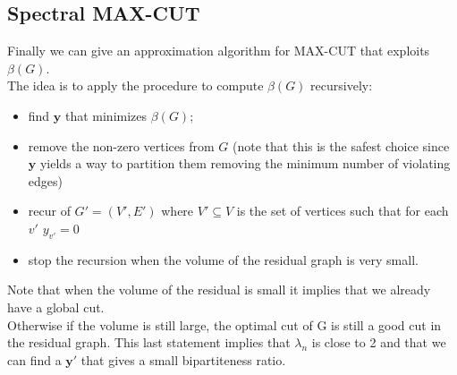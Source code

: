 \subsection{Spectral MAX-CUT}
Finally we can give an approximation algorithm for MAX-CUT that exploits $ \beta(G) $.\\
The idea is to apply the procedure to compute $ \beta(G) $ recursively:
\begin{itemize}
\item find $ \mathbf{y} $ that minimizes $ \beta(G) $;
\item remove the non-zero vertices from $ G $ (note that this is the safest choice since $ \mathbf{y} $ yields a way to partition them removing the minimum number of violating edges)
\item recur of $ G'=(V',E') $ where $ V' \subseteq V $ is the set of vertices such that for each $ v' $ $y_{v'} = 0 $
\item stop the recursion when the volume of the residual graph is very small.
\end{itemize}
Note that when the volume of the residual is small it implies that we already have a global cut.\\
Otherwise if the volume is still large, the optimal cut of G is still a good cut in the residual graph. This last statement implies that $ \lambda_n $ is close to 2 and that we can find a $ \mathbf{y'} $ that gives a small bipartiteness ratio.